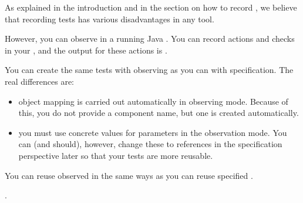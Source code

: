 
As explained in the introduction  and in the section on how to record , we believe that recording tests has various disadvantages in any tool. 

However, you can  observe \gdcases{} in a running Java \gdaut{}. You can record actions and checks in your \gdaut{}, and the output for these actions is \gdsteps{}. 

You can create the same tests with observing as you can with specification. The real differences are:
\begin{itemize}
\item object mapping is carried out automatically in observing mode. Because of this, you do not provide a component name, but one is created automatically. 
\item you must use concrete values for parameters in the observation mode. You can (and should), however, change these to references in the specification perspective later so that your tests are more reusable. 
\end{itemize}

You can reuse observed \gdcases{} in the same ways as you can reuse specified \gdcases{}. 

. 


     



